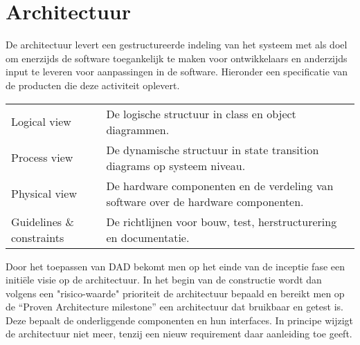 
\section{Architectuur}

De architectuur levert een gestructureerde indeling van het systeem met als doel om enerzijds de software
toegankelijk te maken voor ontwikkelaars en anderzijds input te leveren voor aanpassingen in de software. Hieronder
een specificatie van de producten die deze activiteit oplevert.

{\small\sf
\begin{center}
\begin{tabular}{lp{30em}}
Logical view & De logische structuur in class en object diagrammen.\\
Process view & De dynamische structuur in state
transition diagrams op systeem niveau.\\
Physical view &  De hardware componenten en de verdeling van
software over de hardware componenten.\\
Guidelines \& constraints & De richtlijnen voor bouw,
test, herstructurering en documentatie.\\
\end{tabular}
\end{center}
}

Door het toepassen van DAD bekomt men op het einde van de inceptie fase een
initi\"ele visie op de architectuur. In het begin van de constructie wordt dan
volgens een "risico-waarde" prioriteit de architectuur bepaald en bereikt men
op de ``Proven Architecture milestone'' een architectuur dat bruikbaar en getest
is. Deze bepaalt de onderliggende componenten en hun interfaces.
In principe wijzigt de architectuur niet meer, tenzij een nieuw requirement
daar aanleiding toe geeft.
